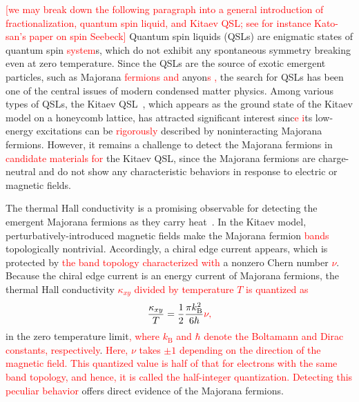 \documentclass[twocolumn,superscriptaddress,showpacs, longbibliography, aps, prb]{revtex4-2}
\newcommand{\red}[1]{\textcolor{red}{#1}}
\newcommand{\blue}[1]{\textcolor{blue}{#1}}
\begin{document}
\red{[we may break down the following paragraph into a general introduction of fractionalization, quantum spin liquid, and Kitaev QSL; see for instance Kato-san's paper on spin Seebeck]}
Quantum spin liquids (QSLs) are enigmatic states of quantum spin \red{system}s,
which do not %
exhibit any 
spontaneous
symmetry breaking even at zero temperature.
Since the QSLs are the source of exotic emergent particles,
such as Majorana %
\red{fermions and} anyon\red{s%
,} the search for QSLs has been 
one of the central issues of modern condensed matter physics.
Among %
various types of QSLs, the Kitaev QSL~\cite{Kitaev2006}, which appears as the ground state
of the Kitaev model on a %
honeycomb lattice, 
has attracted %
significant interest 
sinc\red{e %
i}ts low-energy excitations can be \red{rigorously} described by
noninteracting Majorana fermions.
However, it %
remains a challenge to detect the Majorana fermions
in \red{candidate materials for} the Kitaev QSL, since the Majorana fermions are charge-neutral and do not show any characteristic behaviors 
in response to electric or magnetic fields.

The thermal Hall conductivity is a promising observable for detecting the
emergent Majorana fermions as they carry heat~\cite{Kitaev2006}.
In the Kitaev model, perturbatively-introduced magnetic fields make the Majorana fermion %
\red{bands} topologically nontrivial.
Accordingly, a
chiral edge current appears, which is protected by %
\red{the band topology characterized with} a nonzero Chern number \red{$\nu$}.
Because the chiral edge current is an energy current of Majorana fermions, 
the thermal Hall conductivity %
\red{$\kappa_{xy}$ divided by temperature $T$ is quantized as} %
\begin{align}
{\frac{\kappa_{xy}}{T} = \frac{1}{2} \frac{\pi k_{\mathrm{B}}^2}{6\hbar}}\red{\nu,}
\label{eq:k_xy}
\end{align}
in the zero temperature limit\red{, where $k_{\mathrm{B}}$ and $\hbar$ denote the Boltamann and Dirac constants, respectively}.
\red{Here, $\nu$ takes $\pm 1$ depending on the direction of the magnetic field. This quantized value is half of that for electrons with the same band topology, and hence, it is called the half-integer quantization.} 
\red{Detecting this peculiar behavior} offers
direct evidence of the 
Majorana fermions.
\end{document}
